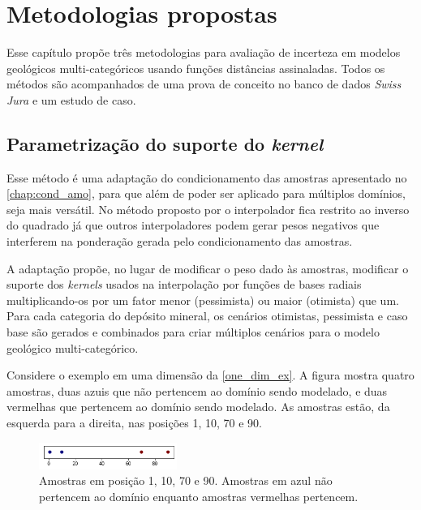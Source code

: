 \chapter{Metodologias propostas}\label{chap3}

Esse capítulo propõe três metodologias para avaliação de incerteza em modelos geológicos multi-categóricos usando funções distâncias assinaladas. Todos os métodos são acompanhados de uma prova de conceito no banco de dados \textit{Swiss Jura} e um estudo de caso. 

\section{Parametrização do suporte do \textit{kernel}}

Esse método é uma adaptação do condicionamento das amostras apresentado no \autoref{chap:cond_amo}, para que além de poder ser aplicado para múltiplos domínios, seja mais versátil. No método proposto por  o interpolador fica restrito ao inverso do quadrado já que outros interpoladores podem gerar pesos negativos que interferem na ponderação gerada pelo condicionamento das amostras.

A adaptação propõe, no lugar de modificar o peso dado às amostras, modificar o suporte dos \textit{kernels} usados na interpolação por funções de bases radiais multiplicando-os por um fator menor (pessimista) ou maior (otimista) que um. Para cada categoria do depósito mineral, os cenários otimistas, pessimista e caso base são gerados e combinados para criar múltiplos cenários para o modelo geológico multi-categórico.

Considere o exemplo em uma dimensão da \autoref{one_dim_ex}. A figura mostra quatro amostras, duas azuis que não pertencem ao domínio sendo modelado, e duas vermelhas que pertencem ao domínio sendo modelado. As amostras estão, da esquerda para a direita, nas posições 1, 10, 70 e 90.

\begin{figure}[H]
	\caption{\label{one_dim_ex} Amostras em posição 1, 10, 70 e 90. Amostras em azul não pertencem ao domínio enquanto amostras vermelhas pertencem.}
	\centering
		\includegraphics[width=0.4\textwidth]{capitulo_3/imagens/pointssd.png}
\end{figure}

